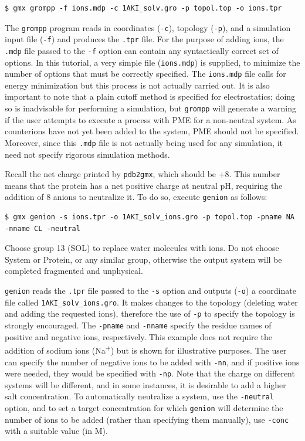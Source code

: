 \documentclass[9pt,tutorial,pubversion]{livecoms}
\begin{document}
\begin{lstlisting}
$ gmx grompp -f ions.mdp -c 1AKI_solv.gro -p topol.top -o ions.tpr
\end{lstlisting}
%
The \texttt{grompp} program reads in coordinates (\texttt{-c}), topology (\texttt{-p}), and a simulation input file (\texttt{-f}) and produces the \texttt{.tpr} file. For the purpose of adding ions, the \texttt{.mdp} file passed to the \texttt{-f} option can contain any syntactically correct set of options. In this tutorial, a very simple file (\texttt{ions.mdp}) is supplied, to minimize the number of options that must be correctly specified. The \texttt{ions.mdp} file calls for energy minimization but this process is not actually carried out. It is also important to note that a plain cutoff method is specified for electrostatics; doing so is inadvisable for performing a simulation, but \texttt{grompp} will generate a warning if the user attempts to execute a process with PME for a non-neutral system. As counterions have not yet been added to the system, PME should not be specified. Moreover, since this \texttt{.mdp} file is not actually being used for any simulation, it need not specify rigorous simulation methods.

Recall the net charge printed by \texttt{pdb2gmx}, which should be +8. This number means that the protein has a net positive charge at neutral pH, requiring the addition of 8 anions to neutralize it. To do so, execute \texttt{genion} as follows:

\begin{lstlisting}
$ gmx genion -s ions.tpr -o 1AKI_solv_ions.gro -p topol.top -pname NA -nname CL -neutral
\end{lstlisting}
%
Choose group 13 (SOL) to replace water molecules with ions. Do not choose System or Protein, or any similar group, otherwise the output system will be completed fragmented and unphysical.

\texttt{genion} reads the \texttt{.tpr} file passed to the \texttt{-s} option and outputs (\texttt{-o}) a coordinate file called \texttt{1AKI\_solv\_ions.gro}. It makes changes to the topology (deleting water and adding the requested ions), therefore the use of \texttt{-p} to specify the topology is strongly encouraged. The \texttt{-pname} and \texttt{-nname} specify the residue names of positive and negative ions, respectively. This example does not require the addition of sodium ions (Na\textsuperscript{+}) but is shown for illustrative purposes. The user can specify the number of negative ions to be added with \texttt{-nn}, and if positive ions were needed, they would be specified with \texttt{-np}. Note that the charge on different systems will be different, and in some instances, it is desirable to add a higher salt concentration. To automatically neutralize a system, use the \texttt{-neutral} option, and to set a target concentration for which \texttt{genion} will determine the number of ions to be added (rather than specifying them manually), use \texttt{-conc} with a suitable value (in M).
\end{document}
